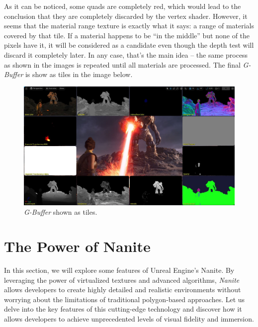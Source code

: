 \documentclass[10pt,journal,compsoc]{IEEEtran}
\begin{document}
\par As it can be noticed, some quads are completely red, which would lead to the conclusion that they are completely discarded by the vertex shader. However, it seems that the material range texture is exactly what it says: a range of materials covered by that tile. If a material happens to be “in the middle” but none of the pixels have it, it will be considered as a candidate even though the depth test will discard it completely later. In any case, that's the main idea – the same process as shown in the images is repeated until all materials are processed. The final \textit{G-Buffer} is show as tiles in the image below.

\begin{figure}[H]
    \centering
    \includegraphics[scale=0.16]{img/fullBuff.jpg}
    \caption{\textit{G-Buffer} shown as tiles\cite{IGN}.}
    \label{fig:gbuff}
\end{figure}



\newpage
\section{The Power of Nanite}\label{sec:4}

\par In this section, we will explore some features of Unreal Engine's Nanite. By leveraging the power of virtualized textures and advanced algorithms, \textit{Nanite} allows developers to create highly detailed and realistic environments without worrying about the limitations of traditional polygon-based approaches. Let us delve into the key features of this cutting-edge technology and discover how it allows developers to achieve unprecedented levels of visual fidelity and immersion.
\end{document}
